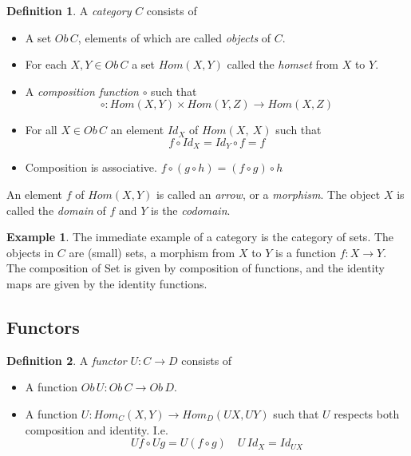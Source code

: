 \documentclass[a4paper,10pt]{article}
\theoremstyle{definition}
\newtheorem{definition}{Definition}[section]
\newtheorem{example}{Example}[section]
\begin{document}
\begin{definition}
    A \textit{category} $C$ consists of
    \begin{itemize}
        \item A set $Ob\,C$, elements of which are called \textit{objects} of $C$.
        \item For each $X, Y \in Ob\,C$
            a set $Hom(X,Y)$ called the \textit{homset} from $X$ to $Y$.
        \item A \textit{composition function} $\circ$ such that
            \begin{equation}
                \circ : Hom(X,Y) \times Hom(Y,Z) \rightarrow Hom(X,Z)
            \end{equation}
        \item For all $X \in Ob\,C$ an element $Id_X$ of $Hom(X,\ X)$ such that
            \begin{equation}
            f \circ Id_X = Id_Y \circ f = f
            \end{equation}
        \item Composition is associative.  $f \circ (g \circ h) = (f \circ g) \circ h$
    \end{itemize}
\end{definition}

\par
An element $f$ of $Hom(X,Y)$ is called an \textit{arrow},
or a \textit{morphism}. The object $X$ is called the \textit{domain} of $f$ and $Y$ is
the \textit{codomain}.\\

\begin{example}
    The immediate example of a category is the category of sets.
    The objects in $C$ are (small) sets,
    a morphism from $X$ to $Y$ is a function $f : X \rightarrow Y$.
    The composition of Set is given by composition of functions,
    and the identity maps are given by the identity functions.
\end{example}

\subsection{Functors}
\begin{definition}
    A \textit{functor} $U : C \rightarrow D$ consists of
    \begin{itemize}
        \item A function $Ob\,U : Ob\,C \rightarrow Ob\,D$.
        \item A function $U : Hom_C(X,Y) \rightarrow Hom_D(UX, UY)$
            such that $U$ respects both composition and identity.
            I.e.
            \begin{equation}
                Uf \circ Ug = U(f \circ g) \quad U\,Id_X = Id_{UX}
            \end{equation}
    \end{itemize}
\end{definition}
\end{document}
